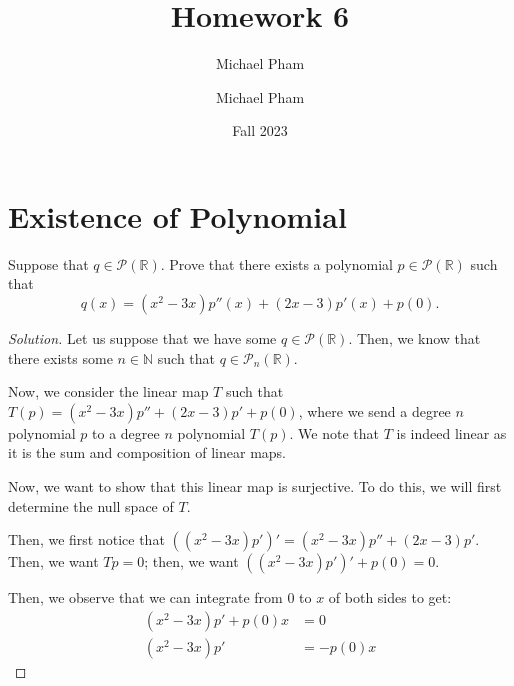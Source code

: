 \documentclass{article}
\title{#1}
\author{Michael Pham}
\date{#2}
\newenvironment{solution}{\begin{proof}[Solution]}{\end{proof}}
\newcommand{\NN}{\mathbb{N}}
\newcommand{\RR}{\mathbb{R}}
\DeclareMathOperator*{\vnull}{\mathrm{null}}
\newcommand{\mytitle}[2]{%
	\title{#1}
	\author{Michael Pham}
	\date{#2}
	\maketitle
	\newpage
	\tableofcontents
	\newpage
}
\begin{document}
	\mytitle{Homework 6}{Fall 2023}
	
	\section{Existence of Polynomial}
	\begin{hw}
		Suppose that $q \in \mathscr{P}(\RR)$. Prove that there exists a polynomial $p \in \mathscr{P}(\RR)$ such that
		\begin{equation*}
			q(x) = (x^{2} -3x)p''(x) + (2x-3)p'(x) + p(0).
		\end{equation*}
	\end{hw}
	\begin{solution}
		Let us suppose that we have some $q \in \mathscr{P}(\RR)$. Then, we know that there exists some $n \in \NN$ such that $q \in \mathscr{P}_{n}(\RR)$.	
		
		Now, we consider the linear map $T$ such that $T(p) = (x^{2} - 3x)p'' + (2x-3)p' + p(0)$, where we send a degree $n$ polynomial $p$ to a degree $n$ polynomial $T(p)$. We note that $T$ is indeed linear as it is the sum and composition of linear maps.
		
		Now, we want to show that this linear map is surjective. To do this, we will first determine the null space of $T$. 
		
		\begin{comment}
			We require $p(0) = 0$, $(2x-3)p' = 0$, and $(x^{2}-3x)p'' = 0$ for $Tp = 0$. 
			
			First, we want $p(0) = 0$. So, we know that for $p = \alpha x^{n} + \ldots + \beta x + \gamma$, we have $\gamma  = 0$ for $p(0) = 0$. Next, since $(2x-3)p' = 0$, then we see that $(2x-3)(n\alpha x^{n-1} + \ldots + \beta) = 2n \alpha x^{n} + \ldots + 2 \beta x - 3(n\alpha x^{n-1} + \ldots + \beta) = 0$. We observe then that for this to be the case, all of the coefficients $\alpha, \ldots, \beta, \gamma$ must all be equal to zero. In other words, we observe then that the only polynomial $p$ such that $Tp = 0$ is the zero-polynomial itself. Thus, we observe that $\vnull T = \left\{  0\right\}$.
		\end{comment}
	
		Then, we first notice that $((x^{2} - 3x)p')' = (x^{2} - 3x)p'' + (2x-3)p'$. Then, we want $Tp = 0$; then, we want $((x^{2} - 3x)p')' + p(0) = 0$.
		
		Then, we observe that we can integrate from $0$ to $x$ of both sides to get:
		\begin{align*}
			(x^{2}-3x)p' + p(0)x &= 0 \\
			(x^{2} - 3x)p' &= -p(0)x
		\end{align*}
	

\end{solution}
\end{document}
